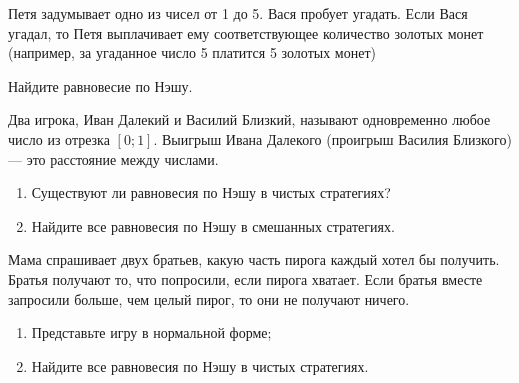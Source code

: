 \begin{problem}

Петя задумывает одно из чисел от 1 до 5. Вася пробует угадать. Если Вася угадал, то Петя выплачивает ему соответствующее количество золотых монет (например, за угаданное число 5 платится 5 золотых монет) \par
Найдите равновесие по Нэшу.

\begin{sol}

\end{sol}
\end{problem}



\begin{problem}\par
Два игрока, Иван Далекий и Василий Близкий, называют одновременно любое число из отрезка  $\left[0;1\right]$. Выигрыш Ивана Далекого (проигрыш Василия Близкого) --- это расстояние между числами.\par
\begin{enumerate}
\item 	Существуют ли равновесия по Нэшу в чистых стратегиях?\par
\item 	Найдите все равновесия по Нэшу в смешанных стратегиях.
\end{enumerate}


\begin{sol}

\end{sol}
\end{problem}



\begin{problem}
Мама спрашивает двух братьев, какую часть пирога каждый хотел бы получить. Братья получают то, что попросили, если пирога хватает. Если братья вместе запросили больше, чем целый пирог, то они не получают ничего.\par
\begin{enumerate}
\item 	Представьте игру в нормальной форме;\par
\item 	Найдите все равновесия по Нэшу в чистых стратегиях.
\end{enumerate}


\begin{sol}

\end{sol}
\end{problem}



